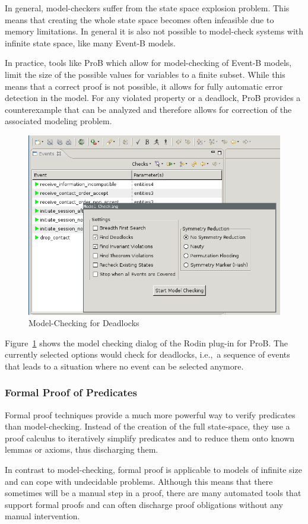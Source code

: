 In general, model-checkers suffer from the state space explosion problem. This
means that creating the whole state space becomes often infeasible due to memory
limitations. In general it is also not possible to model-check systems with
infinite state space, like many Event-B models.

In practice, tools like ProB which allow for model-checking of Event-B models,
limit the size of the possible values for variables to a finite subset. While
this means that a correct proof is not possible, it allows for fully automatic
error detection in the model. For any violated property or a deadlock, ProB
provides a counterexample that can be analyzed and therefore allows for
correction of the associated modeling problem.

\begin{figure}[ht]
  \centering
  \includegraphics[width=.5\textwidth]{figures/ProBModelChecking}
  \caption{Model-Checking for Deadlocks}
  \label{fig:Prob-model-check}
\end{figure}

Figure~\ref{fig:Prob-model-check} shows the model checking dialog of the Rodin
plug-in for ProB. The currently selected options would check for deadlocks,
i.e.,\ a sequence of events that leads to a situation where no event can be
selected anymore.


\subsubsection{Formal Proof of Predicates}
\label{sec:form-proof-pred}

Formal proof techniques provide a much more powerful way to verify predicates
than model-checking. Instead of the creation of the full state-space, they use a
proof calculus to iteratively simplify predicates and to reduce them onto known
lemmas or axioms, thus discharging them.

In contrast to model-checking, formal proof is applicable to models of infinite
size and can cope with undecidable problems. Although this means that there
sometimes will be a manual step in a proof, there are many automated tools that
support formal proofs and can often discharge proof obligations without any
manual intervention.

